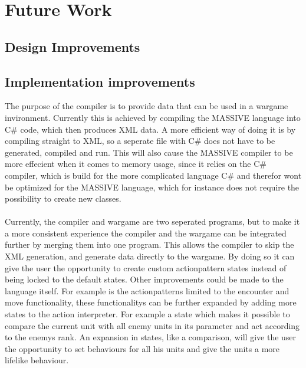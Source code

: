 \chapter{Future Work}
\section{Design Improvements}

\section{Implementation improvements}
The purpose of the compiler is to provide data that can be used in a wargame invironment. 
Currently this is achieved by compiling the MASSIVE language into C\# code, which then produces XML data. 
A more efficient way of doing it is by compiling straight to XML, so a seperate file with C\# does not have to be generated, compiled and run. 
This will also cause the MASSIVE compiler to be more effecient when it comes to memory usage, since it relies on the C\# compiler, which is build for the more complicated language C\# and therefor wont be optimized for the MASSIVE language, which for instance does not require the possibility to create new classes.\\
\\
Currently, the compiler and wargame are two seperated programs, but to make it a more consistent experience the compiler and the wargame can be integrated further by merging them into one program.
This allows the compiler to skip the XML generation, and generate data directly to the wargame. By doing so it can give the user the opportunity to create custom actionpattern states instead of being locked to the default states.\newline
Other improvements could be made to the language itself.
For example is the actionpatterns limited to the encounter and move functionality, these functionalitys can be further expanded by adding more states to the action interpreter. 
For example a state which makes it possible to compare the current unit with all enemy units in its parameter and act according to the enemys rank.
An expansion in states, like a comparison, will give the user the opportunity to set behaviours for all his units and give the units a more lifelike behaviour.\\
\\
